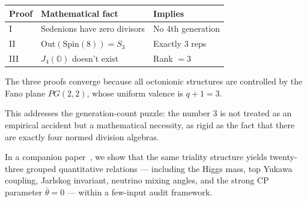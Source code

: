 \documentclass[12pt,a4paper]{article}
\theoremstyle{definition}
\theoremstyle{remark}
\newcommand{\Oct}{\mathbb{O}}
\newcommand{\Out}{\mathrm{Out}}
\newcommand{\Spin}{\mathrm{Spin}}
\begin{document}
\begin{center}
\begin{tabular}{lll}
\hline
\textbf{Proof} & \textbf{Mathematical fact} & \textbf{Implies} \\
\hline
I & Sedenions have zero divisors & No 4th generation \\
II & $\Out(\Spin(8)) = S_3$ & Exactly 3 reps \\
III & $J_4(\Oct)$ doesn't exist & Rank $= 3$ \\
\hline
\end{tabular}
\end{center}

The three proofs converge because all octonionic structures are controlled by 
the Fano plane $PG(2,2)$, whose uniform valence is $q+1 = 3$.

This addresses the generation-count puzzle: the number 3 is not treated as an empirical accident 
but a mathematical necessity, as rigid as the fact that there are exactly four 
normed division algebras.

In a companion paper~\cite{Paper2}, we show that the same triality structure 
yields twenty-three grouped quantitative relations --- including the Higgs mass, top Yukawa 
coupling, Jarlskog invariant, neutrino mixing angles, and the strong CP 
parameter $\bar{\theta} = 0$ --- within a few-input audit framework.
\end{document}
